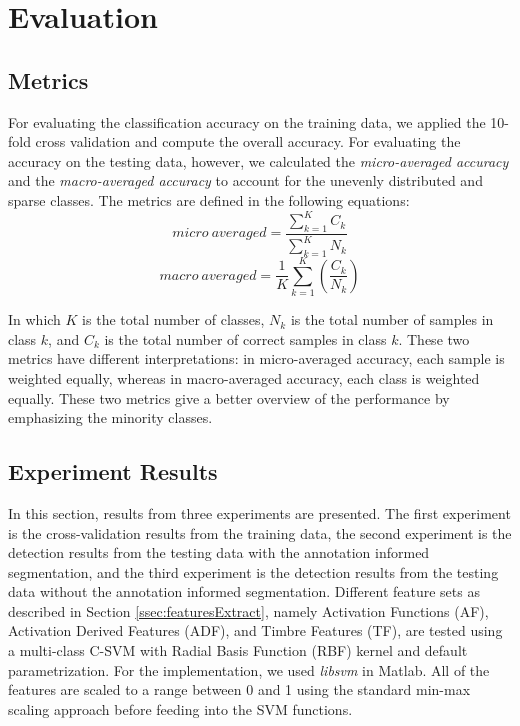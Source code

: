 \documentclass{article}
\begin{document}

\section{Evaluation}\label{sec:eval}
\subsection{Metrics}\label{ssec:metrics}
For evaluating the classification accuracy on the training data, we applied the 10-fold cross validation and compute the overall accuracy. For evaluating the accuracy on the testing data, however, we calculated the \textit{micro-averaged accuracy} and the \textit{macro-averaged accuracy}\cite{yang1999} to account for the unevenly distributed and sparse classes. The metrics are defined in the following equations:
\begin{equation}
micro~averaged = \frac{ \sum_{k = 1}^{K} C_{k} }{ \sum_{k = 1}^{K} N_{k} }
\end{equation}
\begin{equation}
macro~averaged = \frac{1}{K} \sum_{k = 1}^{K} (\frac{C_{k}}{N_{k}})
\end{equation}

In which $K$ is the total number of classes, $N_{k}$ is the total number of samples in class $k$, and $C_{k}$ is the total number of correct samples in class $k$. These two metrics have different interpretations: in micro-averaged accuracy, each sample is weighted equally, whereas in macro-averaged accuracy, each class is weighted equally. These two metrics give a better overview of the performance by emphasizing the minority classes.  


\subsection{Experiment Results}\label{ssec:results}
In this section, results from three experiments are presented. The first experiment is the cross-validation results from the training data, the second experiment is the detection results from the testing data with the annotation informed segmentation, and the third experiment is the detection results from the testing data without the annotation informed segmentation. Different feature sets as described in Section \ref{ssec:featuresExtract}, namely Activation Functions (AF), Activation Derived Features (ADF), and Timbre Features (TF), are tested using a multi-class C-SVM with Radial Basis Function (RBF) kernel and default parametrization. For the implementation, we used \textit{libsvm}\cite{Chang2011} in Matlab.  All of the features are scaled to a range between 0 and 1 using the standard min-max scaling approach before feeding into the SVM functions. 
\end{document}
